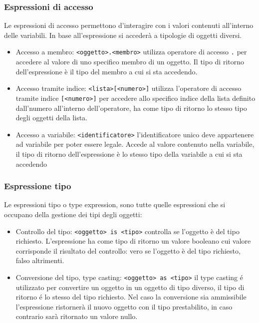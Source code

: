 \subsubsection{Espressioni di accesso}
Le espressioni di accesso permettono d'interagire con i valori contenuti all'interno delle variabili.
In base all'espressione si accederà a tipologie di oggetti diversi.

\begin{itemize}
    \item 
    {
        Accesso a membro: \verb|<oggetto>.<membro>| utilizza operatore di accesso \verb|.| per accedere
        al valore di uno specifico membro di un oggetto.
        Il tipo di ritorno dell'espressione è il tipo del membro a cui si sta accedendo.
    }
    \item 
    {
        Accesso tramite indice: \verb|<lista>[<numero>]| utilizza l'operatore di accesso tramite indice
        \verb|[<numero>]| per accedere allo specifico indice della lista definito dall'numero all'interno
        dell'operatore, ha come tipo di ritorno lo stesso tipo degli oggetti della lista.
    }
    \item 
    {
        Accesso a variabile: \verb|<identificatore>| l'identificatore unico deve appartenere ad variabile
        per poter essere legale. Accede al valore contenuto nella variabile, il tipo di ritorno dell'espressione
        è lo stesso tipo della variabile a cui si sta accedendo
    }
\end{itemize}

\subsubsection{Espressione tipo}
Le espressioni tipo o type expression, sono tutte quelle espressioni che si occupano della 
gestione dei tipi degli oggetti:
\begin{itemize}
    \item
    {
        Controllo del tipo: \verb|<oggetto> is <tipo>| controlla se l'oggetto è del tipo richiesto.
        L'espressione ha come tipo di ritorno un valore booleano cui valore corrisponde il risultato del controllo:
        vero se l'oggetto è del tipo richiesto, falso altrimenti.
    }
    \item 
    {
        Conversione del tipo, type casting: \verb|<oggetto> as <tipo>| il type casting é utilizzato
        per convertire un oggetto in un oggetto di tipo diverso, il tipo di ritorno é lo stesso del tipo richiesto.
        Nel caso la conversione sia ammissibile l'espressione ristornerà il nuovo oggetto con il tipo prestabilito,
        in caso contrario sarà ritornato un valore nullo.
    }
\end{itemize}

